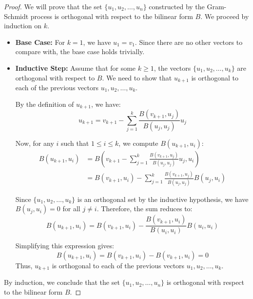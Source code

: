 \documentclass[openany]{book}
\begin{document}
\begin{proof}
We will prove that the set $\{u_1, u_2, \ldots, u_n\}$ constructed by the Gram-Schmidt process is orthogonal with respect to the bilinear form $B$. We proceed by induction on $k$.
\begin{itemize}
    \item \textbf{Base Case:} For $k = 1$, we have $u_1 = v_1$. Since there are no other vectors to compare with, the base case holds trivially.
    \item \textbf{Inductive Step:} Assume that for some $k \geq 1$, the vectors $\{u_1, u_2, \ldots, u_k\}$ are orthogonal with respect to $B$. We need to show that $u_{k+1}$ is orthogonal to each of the previous vectors $u_1, u_2, \ldots, u_k$.
    
    By the definition of $u_{k+1}$, we have:
    $$u_{k+1} = v_{k+1} - \sum_{j=1}^{k} \frac{B(v_{k+1}, u_j)}{B(u_j, u_j)} u_j$$
    
    Now, for any $i$ such that $1 \leq i \leq k$, we compute $B(u_{k+1}, u_i)$:
    \[\begin{aligned}
    B(u_{k+1}, u_i) &= B\left(v_{k+1} - \sum_{j=1}^{k} \frac{B(v_{k+1}, u_j)}{B(u_j, u_j)} u_j, u_i\right) \\
    &= B(v_{k+1}, u_i) - \sum_{j=1}^{k} \frac{B(v_{k+1}, u_j)}{B(u_j, u_j)} B(u_j, u_i)
    \end{aligned}\]
    
    Since $\{u_1, u_2, \ldots, u_k\}$ is an orthogonal set by the inductive hypothesis, we have $B(u_j, u_i) = 0$ for all $j \neq i$. Therefore, the sum reduces to:
    $$B(u_{k+1}, u_i) = B(v_{k+1}, u_i) - \frac{B(v_{k+1}, u_i)}{B(u_i, u_i)} B(u_i, u_i)$$
    
    Simplifying this expression gives:
    $$B(u_{k+1}, u_i) = B(v_{k+1}, u_i) - B(v_{k+1}, u_i) = 0$$
    Thus, $u_{k+1}$ is orthogonal to each of the previous vectors $u_1, u_2, \ldots, u_k$.
\end{itemize}
By induction, we conclude that the set $\{u_1, u_2, \ldots, u_n\}$ is orthogonal with respect to the bilinear form $B$.
\end{proof}
\end{document}

